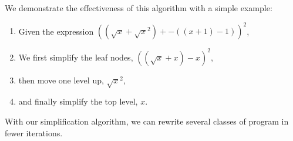 \documentclass{article}
\newcommand{\sqrsqrt}[1]{\sqrt{#1}^2}
\begin{document}
We demonstrate the effectiveness of this algorithm 
with a simple example:

\begin{enumerate}
\item Given the expression
$((\sqrt{x} + \sqrsqrt{x}) + -((x + 1) - 1))^2$,
\item We first simplify the leaf nodes,
$((\sqrt{x} + x) -x)^2$,
\item then move one level up, 
$\sqrt{x}^2$,
\item and finally simplify the top level,
$x$.
\end{enumerate}

With our simplification algorithm, 
we can rewrite several classes of program
in fewer iterations.
\end{document}
